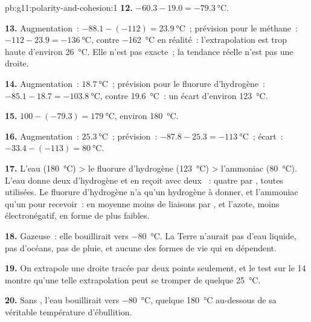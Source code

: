 \begin{solution}{pb:g11:polarity-and-cohesion:1}
\textbf{12.} $-60.3 - 19.0 = \qty{-79.3}{\celsius}$.

\textbf{13.} Augmentation~: $-88.1 - (-112) = \qty{23.9}{\celsius}$~;
prévision pour le méthane~: $-112 - 23.9 = \qty{-136}{\celsius}$, contre
\qty{-162}{\celsius} en réalité~: l'extrapolation est trop haute
d'environ \qty{26}{\celsius}. Elle n'est pas exacte~; la tendance réelle
n'est pas une droite.

\textbf{14.} Augmentation~: $\qty{18.7}{\celsius}$~; prévision pour le
fluorure d'hydrogène~: $-85.1 - 18.7 = \qty{-103.8}{\celsius}$, contre
\qty{19.6}{\celsius}~: un écart d'environ \qty{123}{\celsius}.

\textbf{15.} $100 - (-79.3) = \qty{179}{\celsius}$, environ
\qty{180}{\celsius}.

\textbf{16.} Augmentation~: $\qty{25.3}{\celsius}$~; prévision~:
$-87.8 - 25.3 =
\qty{-113}{\celsius}$~; écart~: $-33.4 - (-113) = \qty{80}{\celsius}$.

\textbf{17.} L'eau (\qty{180}{\celsius}) > le fluorure d'hydrogène
(\qty{123}{\celsius}) > l'ammoniac (\qty{80}{\celsius}). L'eau donne
deux  d'hydrogène et en reçoit avec deux ~:
quatre  par , toutes utilisées. Le fluorure
d'hydrogène n'a qu'un hydrogène à donner, et l'ammoniac qu'un  pour recevoir~: en moyenne moins de liaisons par , et
l'azote, moins électronégatif, en forme de plus faibles.

\textbf{18.} Gazeuse~: elle bouillirait vers \qty{-80}{\celsius}. La
Terre n'aurait pas d'eau liquide, pas d'océans, pas de pluie, et aucune
des formes de vie qui en dépendent.

\textbf{19.} On extrapole une droite tracée par deux points seulement,
et le test sur le  14 montre qu'une telle extrapolation peut se
tromper de quelque \qty{25}{\celsius}.

\textbf{20.} Sans , l'eau bouillirait vers
\qty{-80}{\celsius}, quelque \qty{180}{\celsius} au-dessous de sa
véritable température d'ébullition.
\end{solution}
